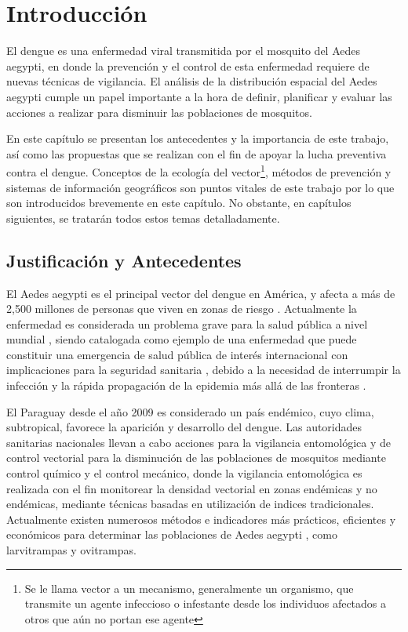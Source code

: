 \chapter{Introducción}

El dengue es una enfermedad viral transmitida por el mosquito del Aedes aegypti, en donde la
prevención y el control de esta enfermedad requiere de nuevas técnicas de vigilancia. El análisis
de la distribución espacial del Aedes aegypti cumple un papel importante a la hora de definir,
planificar y evaluar las acciones a realizar para disminuir las poblaciones de mosquitos.

En este capítulo se presentan los antecedentes y la importancia de este trabajo, así como las
propuestas que se realizan con el fin de apoyar la lucha preventiva contra el dengue. Conceptos de
la ecología del vector\footnote{Se le llama vector a un mecanismo, generalmente un organismo, que
transmite un agente infeccioso o infestante desde los individuos afectados a otros que aún no
portan ese agente}, métodos de prevención y sistemas de información geográficos son puntos
vitales de este trabajo por lo que son introducidos brevemente en este capítulo. No obstante, en
capítulos siguientes, se tratarán todos estos temas detalladamente.

\section{Justificación y Antecedentes}
El Aedes aegypti es el principal vector del dengue en América, y afecta a más de 2,500 millones
de personas que viven en zonas de riesgo \cite{world2009dengue, gustavo2006dengue}. Actualmente la enfermedad es considerada un problema grave para la salud pública a nivel mundial
\cite{dengueUruguayCap1, world2009dengue, DIBO2005}, siendo catalogada como ejemplo de una
enfermedad que puede constituir una emergencia de salud pública de interés internacional con
implicaciones para la seguridad sanitaria \cite{dengueUruguayCap1, world2009dengue}, debido a la
necesidad de interrumpir la infección y la rápida propagación de la epidemia más allá de las
fronteras \cite{world2009dengue}.

El Paraguay desde el año 2009 es considerado un país endémico, cuyo clima, subtropical, favorece
la aparición y desarrollo del dengue. Las autoridades sanitarias nacionales llevan a cabo
acciones para la vigilancia entomológica y de control vectorial para la disminución de las
poblaciones de mosquitos mediante control químico y el control mecánico, donde la vigilancia
entomológica es realizada con el fin monitorear la densidad vectorial en zonas endémicas y no
endémicas, mediante técnicas basadas en utilización de indices tradicionales. Actualmente existen
numerosos métodos e indicadores más prácticos, eficientes y económicos para determinar las
poblaciones de Aedes aegypti \cite{cenaprece2013}, como larvitrampas y ovitrampas.

